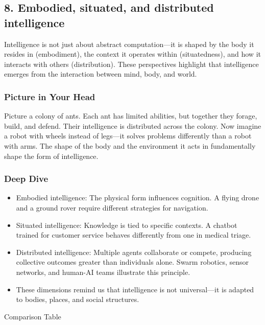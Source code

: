 \documentclass[
  letterpaper,
  DIV=11,
  numbers=noendperiod]{scrreprt}
\providecommand{\tightlist}{%
  \setlength{\itemsep}{0pt}\setlength{\parskip}{0pt}}
\begin{document}
\subsection{8. Embodied, situated, and distributed
intelligence}\label{embodied-situated-and-distributed-intelligence}

Intelligence is not just about abstract computation---it is shaped by
the body it resides in (embodiment), the context it operates within
(situatedness), and how it interacts with others (distribution). These
perspectives highlight that intelligence emerges from the interaction
between mind, body, and world.

\subsubsection{Picture in Your Head}\label{picture-in-your-head-7}

Picture a colony of ants. Each ant has limited abilities, but together
they forage, build, and defend. Their intelligence is distributed across
the colony. Now imagine a robot with wheels instead of legs---it solves
problems differently than a robot with arms. The shape of the body and
the environment it acts in fundamentally shape the form of intelligence.

\subsubsection{Deep Dive}\label{deep-dive-7}

\begin{itemize}
\tightlist
\item
  Embodied intelligence: The physical form influences cognition. A
  flying drone and a ground rover require different strategies for
  navigation.
\item
  Situated intelligence: Knowledge is tied to specific contexts. A
  chatbot trained for customer service behaves differently from one in
  medical triage.
\item
  Distributed intelligence: Multiple agents collaborate or compete,
  producing collective outcomes greater than individuals alone. Swarm
  robotics, sensor networks, and human-AI teams illustrate this
  principle.
\item
  These dimensions remind us that intelligence is not universal---it is
  adapted to bodies, places, and social structures.
\end{itemize}

Comparison Table
\end{document}
